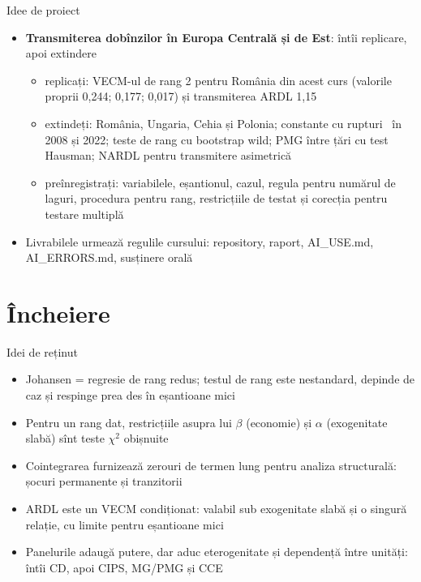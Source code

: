 \begin{frame}{Idee de proiect}
\itemsize{\small}
\begin{itemize}
    \item \textbf{Transmiterea dobînzilor în Europa Centrală și de Est}: întîi replicare, apoi extindere
    \begin{itemize}
        \item replicați: VECM-ul de rang 2 pentru România din acest curs (valorile proprii 0{,}244; 0{,}177; 0{,}017) și transmiterea ARDL 1{,}15
        \item extindeți: România, Ungaria, Cehia și Polonia; constante cu rupturi \ în 2008 și 2022; teste de rang cu bootstrap wild; PMG între țări cu test Hausman; NARDL pentru transmitere asimetrică
        \item preînregistrați: variabilele, eșantionul, cazul, regula pentru numărul de laguri, procedura pentru rang, restricțiile de testat și corecția pentru testare multiplă
    \end{itemize}
    \item Livrabilele urmează regulile cursului: repository, raport, AI\_USE.md, AI\_ERRORS.md, susținere orală
\end{itemize}
\end{frame}


\section{Încheiere}

\begin{frame}{Idei de reținut}
\itemsize{\small}
\begin{itemize}
    \item Johansen = regresie de rang redus; testul de rang este nestandard, depinde de caz și respinge prea des în eșantioane mici
    \item Pentru un rang dat, restricțiile asupra lui $\beta$ (economie) și $\alpha$ (exogenitate slabă) sînt teste $\chi^2$ obișnuite
    \item Cointegrarea furnizează zerouri de termen lung pentru analiza structurală: șocuri permanente și tranzitorii
    \item ARDL este un VECM condiționat: valabil sub exogenitate slabă și o singură relație, cu limite pentru eșantioane mici
    \item Panelurile adaugă putere, dar aduc eterogenitate și dependență între unități: întîi CD, apoi CIPS, MG/PMG și CCE
\end{itemize}
\end{frame}

